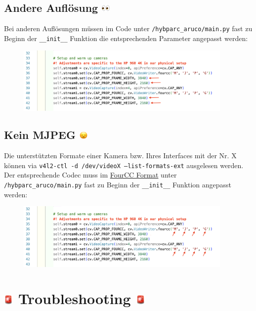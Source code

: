 \documentclass[a4paper]{article}
\newcommand{\code}[1]{\texttt{#1}}
\begin{document}
\subsection{Andere Auflösung \includegraphics[height=0.75em]{emojis/eyes.png}}
\label{sec:custom-resolution}
Bei anderen Auflösungen müssen im Code unter \code{/hybparc\_aruco/main.py} fast zu Beginn der \code{\_\_init\_\_} Funktion die entsprechenden Parameter angepasst werden:
\begin{figure}[h]
    \centering
    \includegraphics[width=10.5cm]{resolution.png}
\end{figure}

\subsection{Kein MJPEG \includegraphics[height=0.75em]{emojis/open-mouth.png}}
\label{ssec:the-mjpeg-problem}
Die unterstützten Formate einer Kamera bzw. Ihres Interfaces mit der Nr. X können via \code{v4l2-ctl -d /dev/videoX --list-formats-ext} ausgelesen werden. Der entsprechende Codec muss im \href{https://fourcc.org/codecs.php}{FourCC Format} unter \code{/hybparc\_aruco/main.py} fast zu Beginn der \code{\_\_init\_\_} Funktion angepasst werden:
\begin{figure}[h]
    \centering
    \includegraphics[width=10.5cm]{fourcc.png}
\end{figure}



\section{\includegraphics[height=0.65em]{emojis/police-light.png} Troubleshooting \includegraphics[height=0.65em]{emojis/police-light.png}}
\label{sec:troubleshooting}
\end{document}
